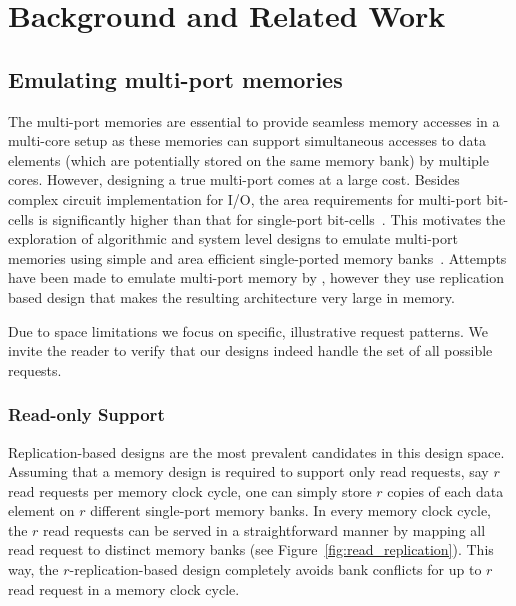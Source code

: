 \section{Background and Related Work}
\label{sec:bg}

\subsection{Emulating multi-port memories}
\label{sec:emulation}

The multi-port memories are essential to provide seamless memory accesses in a multi-core setup as these memories can support simultaneous accesses to data elements (which are potentially stored on the same memory bank) by multiple cores. However, designing a true multi-port comes at a large cost. Besides complex circuit implementation for I/O, the area requirements for multi-port bit-cells is significantly higher than that for single-port bit-cells~\cite{Suzuki,WLCH14}. This motivates the exploration of algorithmic and system level designs to emulate multi-port memories using simple and area efficient single-ported memory banks~\cite{ACP88, EMY91, RG91,Memoir_xor, Memoir_xor_virtual}. Attempts have been made to emulate multi-port memory by \cite{CCES93}, however they use replication based design that makes the resulting architecture very large in memory. 


Due to space limitations we focus on specific, illustrative request patterns. We invite the reader to verify that our designs indeed handle the set of all possible requests.

\subsubsection{Read-only Support} 
\label{sec:read_only}
Replication-based designs are the most prevalent candidates in this design space. Assuming that a memory design is required to support only read requests, say $r$ read requests per memory clock cycle, one can simply store $r$ copies of each data element on $r$ different single-port memory banks. In every memory clock cycle, the $r$ read requests can be served in a straightforward manner by mapping all read request to distinct memory banks (see Figure~\ref{fig:read_replication}). This way, the $r$-replication-based design completely avoids bank conflicts for up to $r$ read request in a memory clock cycle. 

